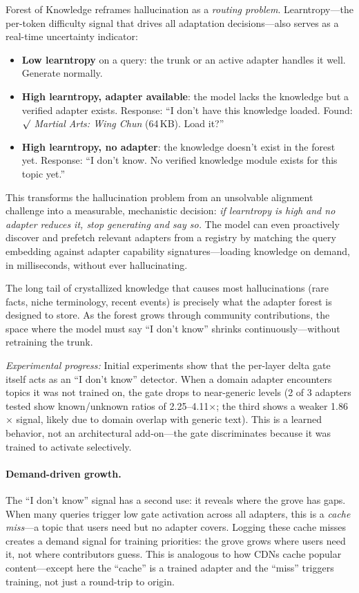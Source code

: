\documentclass[11pt]{article}
\begin{document}
Forest of Knowledge reframes hallucination as a \emph{routing problem}.
Learntropy---the per-token difficulty signal that drives all adaptation
decisions---also serves as a real-time uncertainty indicator:

\begin{itemize}[nosep]
\item \textbf{Low learntropy} on a query: the trunk or an active adapter
      handles it well. Generate normally.
\item \textbf{High learntropy, adapter available}: the model lacks the
      knowledge but a verified adapter exists. Response: ``I don't have
      this knowledge loaded. Found: {$\surd$} \emph{Martial Arts:
      Wing Chun} (64\,KB). Load it?''
\item \textbf{High learntropy, no adapter}: the knowledge doesn't exist
      in the forest yet. Response: ``I don't know. No verified knowledge
      module exists for this topic yet.''
\end{itemize}

This transforms the hallucination problem from an unsolvable alignment
challenge into a measurable, mechanistic decision: \emph{if learntropy is
high and no adapter reduces it, stop generating and say so.} The model
can even proactively discover and prefetch relevant adapters from a
registry by matching the query embedding against adapter capability
signatures---loading knowledge on demand, in milliseconds, without ever
hallucinating.

The long tail of crystallized knowledge that causes most hallucinations
(rare facts, niche terminology, recent events) is precisely what the
adapter forest is designed to store. As the forest grows through community
contributions, the space where the model must say ``I don't know'' shrinks
continuously---without retraining the trunk.

\emph{Experimental progress:} Initial experiments show that the per-layer
delta gate itself acts as an ``I don't know'' detector. When a domain adapter
encounters topics it was not trained on, the gate drops to near-generic levels
(2 of 3 adapters tested show known/unknown ratios of 2.25--4.11$\times$;
the third shows a weaker 1.86$\times$ signal, likely due to domain overlap
with generic text). This is a learned behavior, not an architectural
add-on---the gate discriminates because it was trained to activate selectively.

\paragraph{Demand-driven growth.}
The ``I don't know'' signal has a second use: it reveals where the grove
has gaps. When many queries trigger low gate activation across all adapters,
this is a \emph{cache miss}---a topic that users need but no adapter covers.
Logging these cache misses creates a demand signal for training priorities:
the grove grows where users need it, not where contributors guess. This is
analogous to how CDNs cache popular content---except here the ``cache'' is
a trained adapter and the ``miss'' triggers training, not just a round-trip
to origin.
\end{document}
